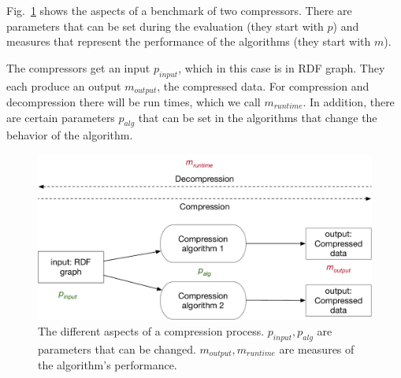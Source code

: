 Fig.~\ref{fig:benchmark_overview} shows the aspects of a benchmark of two compressors. There are parameters that can be set during the evaluation (they start with $p$) and measures that represent the performance of the algorithms (they start with $m$).

The compressors get an input $p_{input}$, which in this case is in RDF graph. They each produce an output $m_{output}$, the compressed data. For compression and decompression there will be run times, which we call $m_{runtime} $. In addition, there are certain parameters $p_{alg}$ that can be set in the algorithms that change the behavior of the algorithm. 

\begin{figure}[h]
	\centering
	\includegraphics[width=1\textwidth]{figures/approach/Benchmark}
	\caption{The different aspects of a compression process. $p_{input},p_{alg}$ are parameters that can be changed. $m_{output},m_{runtime}$ are measures of the algorithm's performance.}
	\label{fig:benchmark_overview}
\end{figure}


